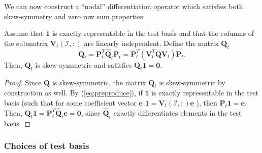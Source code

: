 \documentclass[review]{siamart171218}
\theoremstyle{assumption}
\renewcommand{\hat}{\widehat}
\newcommand{\LRp}[1]{\left( #1 \right)}
\begin{document}
We can now construct a ``nodal'' differentiation operator which satisfies both skew-symmetry and zero row sum properties: 
\begin{lemma}
Assume that $\bm{1}$ is exactly representable in the test basis and that the columns of the submatrix $\bm{V}_t\LRp{\mathcal{I},:}$ are linearly independent.  Define the matrix $\bm{Q}_t$
\begin{equation}
\bm{Q}_t = \bm{P}_t^T\hat{\bm{Q}}_t\bm{P}_t = \bm{P}_t^T\LRp{\bm{V}_t^T\bm{Q}\bm{V}_t}\bm{P}_t.
\label{eq:nodalQ}
\end{equation}
Then, $\bm{Q}_t$ is skew-symmetric and satisfies $\bm{Q}_t\bm{1} = \bm{0}$.  
\label{thm:Qt}
\end{lemma}
\begin{proof}
Since $\bm{Q}$ is skew-symmetric, the matrix $\bm{Q}_t$ is skew-symmetric by construction as well.  By (\ref{eq:preproduce}), if $\bm{1}$ is exactly representable in the test basis (such that for some coefficient vector $\bm{e}$ $\bm{1} = \bm{V}_t\LRp{\mathcal{I},:}\bm{e}$ ), then $\bm{P}_t\bm{1} = \bm{e}$.  Then, $\bm{Q}_t\bm{1} = \bm{P}_t^T\hat{\bm{Q}}_t\bm{e} = \bm{0}$, since $\hat{\bm{Q}}_t$ exactly differentiates elements in the test basis.
\end{proof}

\subsubsection{Choices of test basis}
\end{document}
